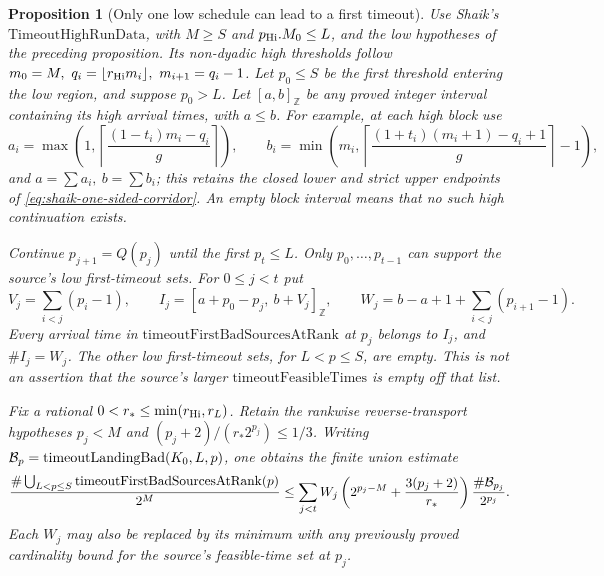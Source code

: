 \documentclass[11pt]{article}
\newtheorem{proposition}{Proposition}
\theoremstyle{remark}\newtheorem{remark}[proposition]{Remark}
\begin{document}
\begin{proposition}[Only one low schedule can lead to a first timeout]
\label{prop:shaik-low-timeout-support}
Use Shaik's \(\mathrm{TimeoutHighRunData}\), with
\(M\ge S\) and \(p_{\rm Hi}.M_0\le L\), and the low hypotheses
of the preceding proposition.
Its non-dyadic high thresholds follow
\(m_0=M,\ q_i=\lfloor r_{\rm Hi}m_i\rfloor,\ m_{i+1}=q_i-1\).
Let \(p_0\le S\) be the first threshold entering the low region,
and suppose \(p_0>L\). Let \([a,b]_{\mathbb Z}\) be any proved
integer interval containing its high arrival times, with \(a\le b\).
For example, at each high block use
\[
 a_i=\max\!\left(1,\left\lceil
          \frac{(1-t_i)m_i-q_i}{g}\right\rceil\right),\qquad
 b_i=\min\!\left(m_i,\left\lceil
          \frac{(1+t_i)(m_i+1)-q_i+1}{g}\right\rceil-1\right),
\]
and \(a=\sum a_i,\ b=\sum b_i\); this retains the closed lower
and strict upper endpoints of \eqref{eq:shaik-one-sided-corridor}.
An empty block interval means that no such high continuation exists.

Continue \(p_{j+1}=Q(p_j)\) until the first \(p_t\le L\).
Only \(p_0,\ldots,p_{t-1}\) can support the source's low first-timeout
sets. For \(0\le j<t\) put
\[
 V_j=\sum_{i<j}(p_i-1),\qquad
 I_j=[a+p_0-p_j,\ b+V_j]_{\mathbb Z},\qquad
 W_j=b-a+1+\sum_{i<j}(p_{i+1}-1).
\]
Every arrival time in \(\mathrm{timeoutFirstBadSourcesAtRank}\)
at \(p_j\) belongs to \(I_j\), and \(\#I_j=W_j\).
The other low first-timeout sets, for \(L<p\le S\), are empty.
This is not an assertion that the source's larger
\(\mathrm{timeoutFeasibleTimes}\) is empty off that list.

Fix a rational \(0<r_*\le\min(r_{\rm Hi},r_L)\). Retain the
rankwise reverse-transport hypotheses
\(p_j<M\) and \((p_j+2)/(r_*2^{p_j})\le1/3\).
Writing \({\cal B}_{p}=\mathrm{timeoutLandingBad}(K_0,L,p)\), one obtains
the finite union estimate
\begin{equation}\label{eq:shaik-low-refined-count}
 \frac{\#\bigcup_{L<p\le S}\mathrm{timeoutFirstBadSourcesAtRank}(p)}
      {2^M}
 \le
 \sum_{j<t}W_j
       \left(2^{p_j-M}+\frac{3(p_j+2)}{r_*}\right)
       \frac{\#{\cal B}_{p_j}}{2^{p_j}} .
\end{equation}
Each \(W_j\) may also be replaced by its minimum with any previously
proved cardinality bound for the source's feasible-time set at \(p_j\).
\end{proposition}
\end{document}
